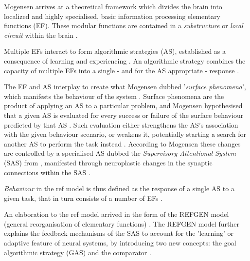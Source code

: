 \documentclass[a4paper,oneside]{memoir}
\begin{document}
Mogensen arrives at a theoretical framework which divides the
brain into localized and highly specialised, basic information
processing elementary functions (EF). These modular functions are contained
in a \textit{substructure} or \textit{local circuit}
within the brain \autocite{Mogensen2011}.

Multiple EFs interact to form algorithmic strategies (AS), established as
a consequence of learning and experiencing \autocite{Mogensen2011}. An
algorithmic strategy combines the capacity of multiple EFs into a single - and
for the AS appropriate - response \autocite{Mogensen2011, Mogensen2012b}.

The EF and AS interplay to create what Mogensen dubbed '\textit{surface
phenomena}', which manifests the behaviour of the system \autocite{Mogensen2011}.
Surface phenomena are the product of applying an AS to a particular problem,
and Mogensen hypothesised that a given AS is evaluated for every success or
failure of the surface behaviour predicted by that AS \autocite{Mogensen2011}.
Such evaluation either strengthens the AS's association with the given
behaviour scenario, or weakens it, potentially starting a search for another
AS to perform the task instead \autocite{Mogensen2011}.
According to Mogensen these changes are controlled by a specialised AS dubbed
the \textit{Supervisory Attentional System} (SAS) from \autocite{Norman1986},
manifested through neuroplastic changes in the synaptic connections within
the SAS \autocite{Mogensen2011}.

\textit{Behaviour} in the \gls{ref} model is thus defined as the response of a single
AS to a given task, that in turn consists of a number of EFs
\autocite{Mogensen2011, Mogensen2012b}.


An elaboration to the \gls{ref} model arrived in the form of the REFGEN
model (general reorganisation of elementary functions) \autocite{Mogensen2017}.
The REFGEN model further explains the feedback mechanisms of the SAS
to account for the 'learning' or adaptive feature of neural systems, by
introducing two new concepts: the goal algorithmic strategy (GAS) and the
comparator \autocite{Mogensen2017, Mogensen2012b}.
\end{document}
